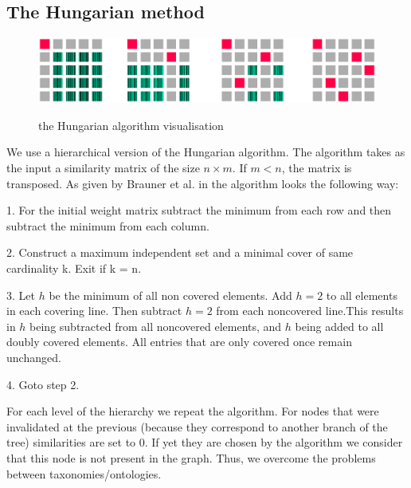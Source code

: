 \documentclass[11pt,a4paper]{article}
\begin{document}
\subsection{The Hungarian method}
\begin{figure}
	
	\centering
	\small
	\includegraphics[scale=0.3]{hungarian}\\
	
	\caption{the Hungarian algorithm visualisation}
	\label{hungarian}
\end{figure}
We use a hierarchical version of the Hungarian algorithm. The algorithm takes as the input a similarity matrix of the size $n \times m$. If $m < n$, the matrix is transposed. As given by Brauner et al. in \citeyear{hungarian-listing} the algorithm looks the following way:

1. For the initial weight matrix subtract the minimum from each row and then subtract the minimum from each column.

2. Construct a maximum independent set and a minimal cover of same cardinality k. Exit if k = n.

3. Let $h$ be the minimum of all non covered elements. Add $h=2$ to all elements in each covering line. Then subtract $h=2$ from each noncovered line.This results in $h$ being subtracted from all noncovered elements, and $h$ being added to all doubly covered elements. All entries that are only covered once remain unchanged.

4. Goto step 2.

For each level of the hierarchy we repeat the algorithm. For nodes that were invalidated at the previous (because they correspond to another branch of the tree) similarities are set to 0. If yet they are chosen by the algorithm we consider that this node is not present in the graph. Thus, we overcome the problems between taxonomies/ontologies.
%
\end{document}
